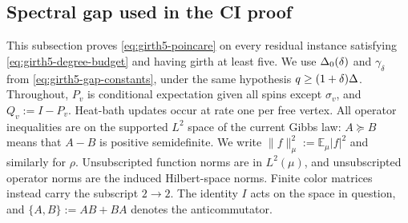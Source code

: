 \subsection{Spectral gap used in the CI proof}
\label{sec:fixed-girth-ci}\label{app:fixed-girth-ci}

This subsection proves \eqref{eq:girth5-poincare} on every residual instance
satisfying \eqref{eq:girth5-degree-budget} and having girth at least five.
We use $\Delta_0(\delta)$ and $\gamma_\delta$ from
\eqref{eq:girth5-gap-constants}, under the same hypothesis
$q\ge(1+\delta)\Delta$.  Throughout, $P_v$
is conditional expectation given all spins except $\sigma_v$, and
$Q_v:=I-P_v$.  Heat-bath updates occur at rate one per free vertex.
All operator inequalities are on the supported $L^2$ space of the current
Gibbs law: $A\succeq B$ means that $A-B$ is positive semidefinite.
We write $\|f\|_\mu^2:=\mathbb E_\mu|f|^2$ and similarly for $\rho$.
Unsubscripted function norms are in $L^2(\mu)$, and unsubscripted operator
norms are the induced Hilbert-space norms.  Finite color matrices instead
carry the subscript $2\to2$.  The identity $I$ acts on the space in
question, and $\{A,B\}:=AB+BA$ denotes the anticommutator.

